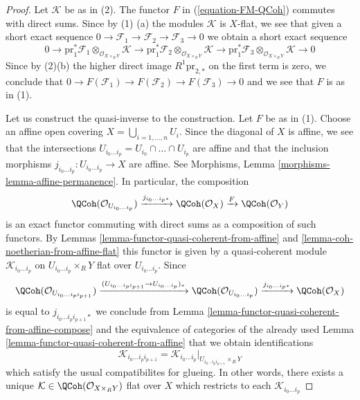 \begin{proof}
Let $\mathcal{K}$ be as in (2). The functor $F$ in
(\ref{equation-FM-QCoh}) commutes with direct sums.
Since by (1) (a) the modules $\mathcal{K}$ is $X$-flat,
we see that given a short exact
sequence $0 \to \mathcal{F}_1 \to \mathcal{F}_2 \to \mathcal{F}_3 \to 0$
we obtain a short exact sequence
$$
0 \to
\text{pr}_1^*\mathcal{F}_1 \otimes_{\mathcal{O}_{X \times_R Y}} \mathcal{K} \to
\text{pr}_1^*\mathcal{F}_2 \otimes_{\mathcal{O}_{X \times_R Y}} \mathcal{K} \to
\text{pr}_1^*\mathcal{F}_3 \otimes_{\mathcal{O}_{X \times_R Y}} \mathcal{K} \to
0
$$
Since by (2)(b) the higher direct image $R^1\text{pr}_{2, *}$
on the first term is zero, we conclude that
$0 \to F(\mathcal{F}_1) \to F(\mathcal{F}_2) \to F(\mathcal{F}_3) \to 0$
and we see that $F$ is as in (1).

\medskip\noindent
Let us construct the quasi-inverse to the construction. Let $F$ be
as in (1). Choose an affine open covering $X = \bigcup_{i = 1, \ldots, n} U_i$.
Since the diagonal of $X$ is affine, we see that the intersections
$U_{i_0 \ldots i_p} = U_{i_0} \cap \ldots \cap U_{i_p}$ are affine
and that the inclusion morphisms
$j_{i_0 \ldots i_p} : U_{i_0 \ldots i_p} \to X$
are affine. See Morphisms, Lemma \ref{morphisms-lemma-affine-permanence}.
In particular, the composition
$$
\QCoh(\mathcal{O}_{U_{i_0 \ldots i_p}})
\xrightarrow{j_{i_0 \ldots i_p *}}
\QCoh(\mathcal{O}_X) \xrightarrow{F}
\QCoh(\mathcal{O}_Y)
$$
is an exact functor commuting with direct sums as a composition of such
functors. By Lemmas \ref{lemma-functor-quasi-coherent-from-affine} and
\ref{lemma-coh-noetherian-from-affine-flat}
this functor is given by a quasi-coherent module
$\mathcal{K}_{i_0 \ldots i_p}$ on $U_{i_0 \ldots i_p} \times_R Y$
flat over $U_{i_0 \ldots i_p}$. Since
$$
\QCoh(\mathcal{O}_{U_{i_0 \ldots i_p i_{p + 1}}})
\xrightarrow{(U_{i_0 \ldots i_p i_{p + 1}} \to U_{i_0 \ldots i_p})_*}
\QCoh(\mathcal{O}_{U_{i_0 \ldots i_p}})
\xrightarrow{j_{i_0 \ldots i_p *}}
\QCoh(\mathcal{O}_X)
$$
is equal to $j_{i_0 \ldots i_p i_{p + 1} *}$ we conclude from
Lemma \ref{lemma-functor-quasi-coherent-from-affine-compose}
and the equivalence of categories of the already used
Lemma \ref{lemma-functor-quasi-coherent-from-affine}
that we obtain identifications
$$
\mathcal{K}_{i_0 \ldots i_p i_{p + 1}} =
\mathcal{K}_{i_0 \ldots i_p}|_{U_{i_0 \ldots i_p i_{p + 1}} \times_R Y}
$$
which satisfy the usual compatibilites for glueing.
In other words, there exists a unique
$\mathcal{K} \in \QCoh(\mathcal{O}_{X \times_R Y})$
flat over $X$ which restricts to each $\mathcal{K}_{i_0 \ldots i_p}$

\end{proof}

